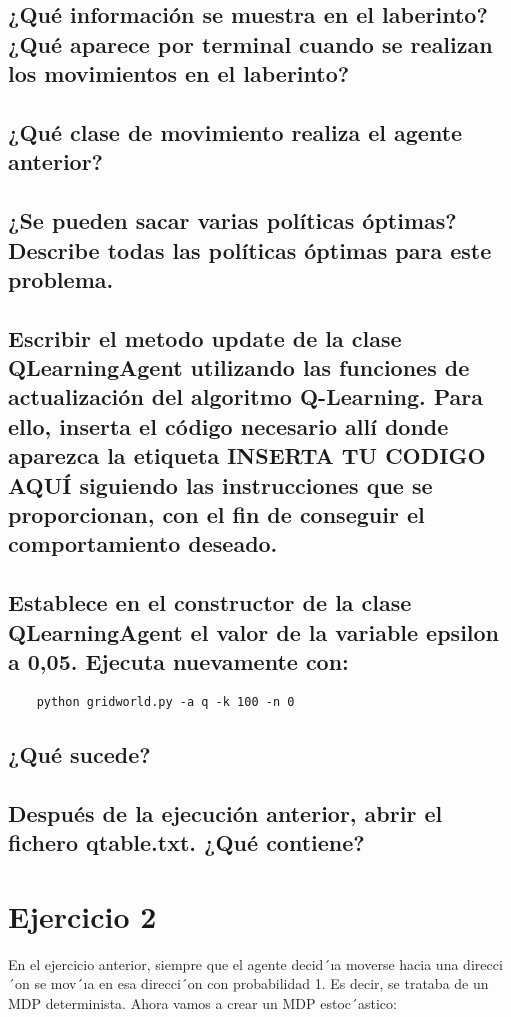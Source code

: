\documentclass[12pt]{article}
\begin{document}
    \subsection{¿Qué información se muestra en el laberinto? ¿Qué aparece por terminal cuando se realizan los
    movimientos en el laberinto?}
    \subsection{¿Qué clase de movimiento realiza el agente anterior?}
    \subsection{¿Se pueden sacar varias políticas óptimas? Describe todas las políticas óptimas para este problema.}
    \subsection{Escribir el metodo update de la clase QLearningAgent utilizando las funciones de actualización del algoritmo
    Q-Learning. Para ello, inserta el código necesario allí donde aparezca la etiqueta INSERTA TU CODIGO
    AQUÍ siguiendo las instrucciones que se proporcionan, con el fin de conseguir el comportamiento deseado.}
    \subsection{Establece en el constructor de la clase QLearningAgent el valor de la variable epsilon a 0,05.
    Ejecuta nuevamente con:}
    \begin{verbatim}
    python gridworld.py -a q -k 100 -n 0
    \end{verbatim}
    \subsection*{¿Qué sucede?}
    \subsection{Después de la ejecución anterior, abrir el fichero qtable.txt. ¿Qué contiene?}


    \section*{Ejercicio 2}
    En el ejercicio anterior, siempre que el agente decid´ıa moverse hacia una direcci´on se mov´ıa en esa direcci´on
    con probabilidad 1. Es decir, se trataba de un MDP determinista. Ahora vamos a crear un MDP estoc´astico:
\end{document}
